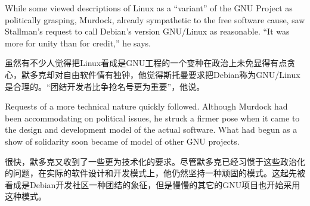 


\ifdefined\eng
While some viewed descriptions of Linux as a ``variant'' of the GNU Project as politically grasping, Murdock, already sympathetic to the free software cause, saw Stallman's request to call Debian's version GNU/Linux as reasonable. ``It was more for unity than for credit,'' he says.
\fi

\ifdefined\chs
虽然有不少人觉得把Linux看成是GNU工程的一个变种在政治上未免显得有点贪心，默多克却对自由软件情有独钟，他觉得斯托曼要求把Debian称为GNU/Linux是合理的。``团结开发者比争抢名号更为重要''，他说。
\fi

\ifdefined\eng
Requests of a more technical nature quickly followed. Although Murdock had been accommodating on political issues, he struck a firmer pose when it came to the design and development model of the actual software. What had begun as a show of solidarity soon became of model of other GNU projects.
\fi

\ifdefined\chs
很快，默多克又收到了一些更为技术化的要求。尽管默多克已经习惯于这些政治化的问题，在实际的软件设计和开发模式上，他仍然坚持一种顽固的模式。这起先被看成是Debian开发社区一种团结的象征，但是慢慢的其它的GNU项目也开始采用这种模式。
\fi

